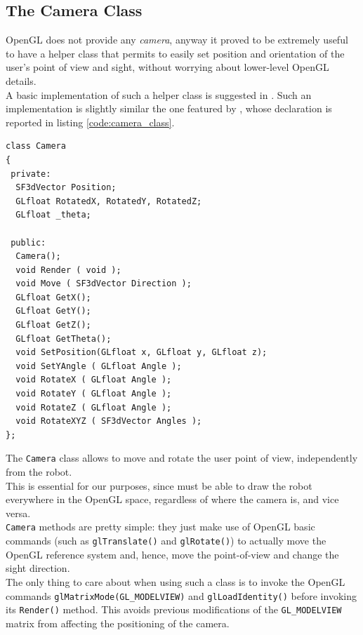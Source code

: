 \subsection{The Camera Class}
\label{rear:classes:cameraclass}

OpenGL does not provide any \textit{camera}, anyway it proved 
to be extremely useful to have a helper class that permits 
to easily set position and orientation of the user's 
point of view and sight, without worrying about lower-level 
OpenGL details.
\\
A basic implementation of such a helper class is suggested 
in \cite{opengl:camera}. Such an implementation is slightly 
similar the one featured by \framework{}, whose 
declaration is reported in listing \ref{code:camera_class}.
\\
\begin{lstlisting}[caption={\texttt{Camera} class declaration}, label={code:camera_class}]
class Camera
{
 private:
  SF3dVector Position;
  GLfloat RotatedX, RotatedY, RotatedZ;	
  GLfloat _theta;

 public:
  Camera();
  void Render ( void );
  void Move ( SF3dVector Direction );
  GLfloat GetX();
  GLfloat GetY();
  GLfloat GetZ();
  GLfloat GetTheta();
  void SetPosition(GLfloat x, GLfloat y, GLfloat z);
  void SetYAngle ( GLfloat Angle );
  void RotateX ( GLfloat Angle );
  void RotateY ( GLfloat Angle );
  void RotateZ ( GLfloat Angle );
  void RotateXYZ ( SF3dVector Angles );
};
\end{lstlisting}

The \texttt{Camera} class allows to move and rotate the user 
point of view, independently from the robot.
\\
This is essential for our purposes, since \framework{}
must be able to draw the robot everywhere in the OpenGL space, 
regardless of where the camera is, and vice versa.
\\
\texttt{Camera} methods are pretty simple: they just make 
use of OpenGL basic commands (such as \texttt{glTranslate()} 
and \texttt{glRotate()}) to actually move the OpenGL reference 
system and, hence, move the point-of-view and change the sight 
direction.
\\
The only thing to care about when using such a class is 
to invoke the OpenGL commands \texttt{glMatrixMode(GL\_MODELVIEW)} 
and \texttt{glLoadIdentity()} before invoking its 
\texttt{Render()} method. This avoids previous modifications 
of the \texttt{GL\_MODELVIEW} matrix from affecting the 
positioning of the camera.


